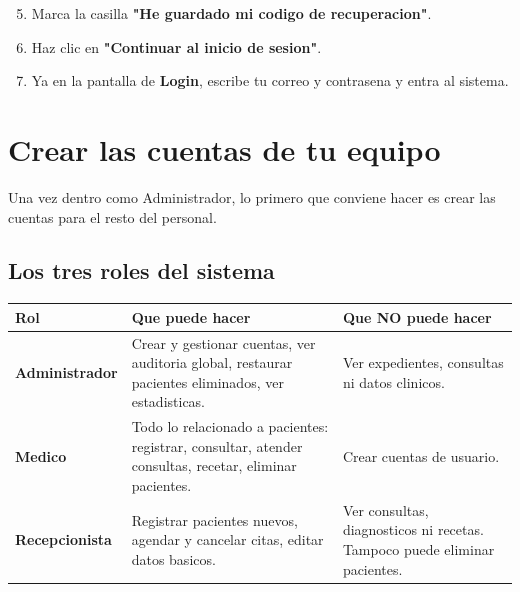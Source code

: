 \documentclass[11pt,a4paper]{article}
\begin{document}
\begin{enumerate}
    \setcounter{enumi}{4}
    \item Marca la casilla \textbf{"He guardado mi codigo de recuperacion"}.
    \item Haz clic en \textbf{"Continuar al inicio de sesion"}.
    \item Ya en la pantalla de \textbf{Login}, escribe tu correo y contrasena y entra al sistema.
\end{enumerate}

\section{Crear las cuentas de tu equipo}

Una vez dentro como Administrador, lo primero que conviene hacer es crear las cuentas para el resto del personal.
\subsection{Los tres roles del sistema}

\begin{longtable}{|L{2.8cm}|L{5cm}|L{5cm}|}
    \hline
    \textbf{Rol}           & \textbf{Que puede hacer}                                                                               & \textbf{Que NO puede hacer}                                               \\
    \hline
    \endhead

    \textbf{Administrador} & Crear y gestionar cuentas, ver auditoria global, restaurar pacientes eliminados, ver estadisticas.     & Ver expedientes, consultas ni datos clinicos.                             \\
    \hline

    \textbf{Medico}        & Todo lo relacionado a pacientes: registrar, consultar, atender consultas, recetar, eliminar pacientes. & Crear cuentas de usuario.                                                 \\
    \hline

    \textbf{Recepcionista} & Registrar pacientes nuevos, agendar y cancelar citas, editar datos basicos.                            & Ver consultas, diagnosticos ni recetas. Tampoco puede eliminar pacientes. \\
    \hline
\end{longtable}
\end{document}
